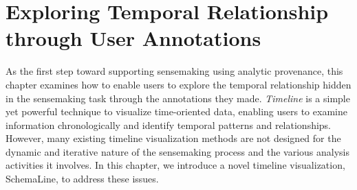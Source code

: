 \chapter{Exploring Temporal Relationship through User Annotations}
\label{chap:schemaline}

\graphicspath{{Chapter3/figures/}}
As the first step toward supporting sensemaking using analytic provenance, this chapter examines how to enable users to explore the temporal relationship hidden in the sensemaking task through the annotations they made. \emph{Timeline} is a simple yet powerful technique to visualize time-oriented data, enabling users to examine information chronologically and identify temporal patterns and relationships. However, many existing timeline visualization methods are not designed for the dynamic and iterative nature of the sensemaking process and the various analysis activities it involves. In this chapter, we introduce a novel timeline visualization, SchemaLine, to address these issues.

